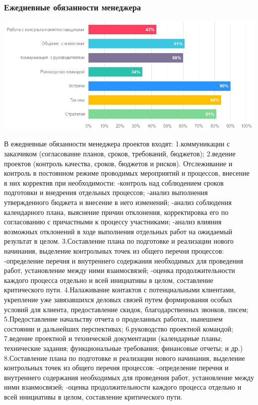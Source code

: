 \documentclass{../industrial-development}
\begin{document}
{~\cite{How_to_be_a_good_IT-manager}


\begin{frame} \frametitle{Ежедневные обязанности менеджера}
{\includegraphics[width=1\linewidth]{day.png}}
\end{frame}
\lecturenotes
В ежедневные обязанности менеджера проектов входят: 
1.коммуникации с заказчиком (согласование планов, сроков, требований, бюджетов); 
2.ведение проектов (контроль качества, сроков, бюджетов и рисков). Отслеживание и контроль в постоянном режиме проводимых мероприятий и процессов, внесение в них корректив при необходимости: 
-контроль над соблюдением сроков подготовки и внедрения отдельных процессов; 
-анализ выполнения утвержденного бюджета и внесение в него изменений; 
-анализ соблюдения календарного плана, выяснение причин отклонения, корректировка его по согласованию с причастными к процессу участниками; 
-анализ влияния возможных отклонений в ходе выполнения отдельных работ на ожидаемый результат в целом. 
3.Составление плана по подготовке и реализации нового начинания, выделение контрольных точек из общего перечня процессов: 
-определение перечня и внутреннего содержания необходимых для проведения работ, установление между ними взаимосвязей; 
-оценка продолжительности каждого процесса отдельно и всей инициативы в целом, составление критического пути. 
4.Налаживание контактов с потенциальными клиентами, укрепление уже завязавшихся деловых связей путем формирования особых условий для клиента, предоставление скидок, благодарственных звонков, писем; 
5.Предоставление начальству отчета о проделанных работах, нынешнем состоянии и дальнейших перспективах; 
6.руководство проектной командой; 
7.ведение проектной и технической документации (календарные планы; технические задания; функциональные требования; финансовые отчеты; и др.) 
8.Составление плана по подготовке и реализации нового начинания, выделение контрольных точек из общего перечня процессов: 
-определение перечня и внутреннего содержания необходимых для проведения работ, установление между ними взаимосвязей; 
-оценка продолжительности каждого процесса отдельно и всей инициативы в целом, составление критического пути.



}
\end{document}

